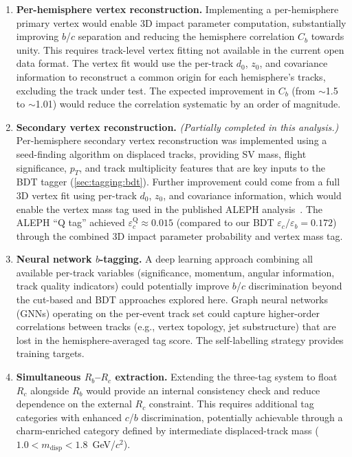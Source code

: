 \documentclass[11pt,a4paper]{article}
\begin{document}
\begin{enumerate}
\item \textbf{Per-hemisphere vertex reconstruction.}
  Implementing a per-hemisphere primary vertex would enable
  3D impact parameter computation, substantially improving
  $b$/$c$ separation and reducing the hemisphere correlation
  $C_b$ towards unity.
  This requires track-level vertex fitting not available in the
  current open data format.
  The vertex fit would use the per-track $d_0$, $z_0$, and
  covariance information to reconstruct a common origin for
  each hemisphere's tracks, excluding the track under test.
  The expected improvement in $C_b$ (from $\sim$1.5 to $\sim$1.01)
  would reduce the correlation systematic by an order of magnitude.

\item \textbf{Secondary vertex reconstruction.}
  \textit{(Partially completed in this analysis.)}
  Per-hemisphere secondary vertex reconstruction was implemented
  using a seed-finding algorithm on displaced tracks, providing
  SV mass, flight significance, $p_T$, and track multiplicity
  features that are key inputs to the BDT tagger
  (\cref{sec:tagging:bdt}).
  Further improvement could come from a full 3D vertex fit using
  per-track $d_0$, $z_0$, and covariance information, which would
  enable the vertex mass tag used in the published ALEPH
  analysis~\cite{ALEPH:Rb:1996}.
  The ALEPH ``Q tag'' achieved $\varepsilon_c^\text{Q}
  \approx 0.015$ (compared to our BDT
  $\varepsilon_c/\varepsilon_b = 0.172$) through the combined
  3D impact parameter probability and vertex mass tag.

\item \textbf{Neural network $b$-tagging.}
  A deep learning approach combining all available per-track
  variables (significance, momentum, angular information, track
  quality indicators) could potentially improve $b$/$c$
  discrimination beyond the cut-based and BDT approaches explored
  here.
  Graph neural networks (GNNs) operating on the per-event track
  set could capture higher-order correlations between tracks
  (e.g., vertex topology, jet substructure) that are lost in the
  hemisphere-averaged tag score.
  The self-labelling strategy provides training targets.

\item \textbf{Simultaneous $R_b$--$R_c$ extraction.}
  Extending the three-tag system to float $R_c$ alongside $R_b$
  would provide an internal consistency check and reduce
  dependence on the external $R_c$ constraint.
  This requires additional tag categories with enhanced $c$/$b$
  discrimination, potentially achievable through a charm-enriched
  category defined by intermediate displaced-track mass
  ($1.0 < m_\text{disp} < 1.8$~GeV/$c^2$).


\end{enumerate}
\end{document}
